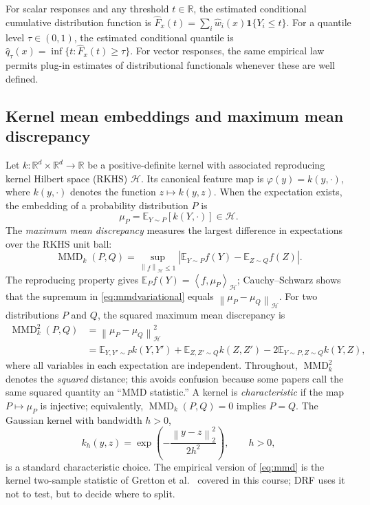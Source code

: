 \documentclass[12pt,a4paper]{article}
\newcommand{\E}{\mathbb E}
\newcommand{\R}{\mathbb R}
\newcommand{\calH}{\mathcal H}
\newcommand{\MMD}{\operatorname{MMD}}
\newcommand{\1}{\mathbf 1}
\newcommand{\norm}[1]{\left\lVert#1\right\rVert}
\newcommand{\ip}[2]{\left\langle#1,#2\right\rangle}
\begin{document}
For scalar responses and any threshold $t\in\R$, the estimated conditional cumulative distribution function is $\widehat F_x(t)=\sum_i\widehat w_i(x)\1\{Y_i\le t\}$. For a quantile level $\tau\in(0,1)$, the estimated conditional quantile is $\widehat q_\tau(x)=\inf\{t:\widehat F_x(t)\ge\tau\}$. For vector responses, the same empirical law permits plug-in estimates of distributional functionals whenever these are well defined.

\subsection{Kernel mean embeddings and maximum mean discrepancy}
Let $k:\R^d\times\R^d\to\R$ be a positive-definite kernel with associated reproducing kernel Hilbert space (RKHS) $\calH$. Its canonical feature map is $\varphi(y)=k(y,\cdot)$, where $k(y,\cdot)$ denotes the function $z\mapsto k(y,z)$. When the expectation exists, the embedding of a probability distribution $P$ is
\begin{equation}\label{eq:embedding}
 \mu_P=\E_{Y\sim P}[k(Y,\cdot)]\in\calH.
\end{equation}
The \emph{maximum mean discrepancy} measures the largest difference in expectations over the RKHS unit ball:
\begin{equation}\label{eq:mmdvariational}
 \MMD_k(P,Q)=\sup_{\norm{f}_{\calH}\le1}
 \left|\E_{Y\sim P}f(Y)-\E_{Z\sim Q}f(Z)\right|.
\end{equation}
The reproducing property gives $\E_P f(Y)=\ip{f}{\mu_P}_{\calH}$; Cauchy--Schwarz shows that the supremum in \eqref{eq:mmdvariational} equals $\norm{\mu_P-\mu_Q}_{\calH}$. For two distributions $P$ and $Q$, the squared maximum mean discrepancy is
\begin{align}\label{eq:mmd}
 \MMD_k^2(P,Q)&=\norm{\mu_P-\mu_Q}_{\calH}^2\\
 &=\E_{Y,Y'\sim P}k(Y,Y')+\E_{Z,Z'\sim Q}k(Z,Z')
 -2\E_{Y\sim P,Z\sim Q}k(Y,Z),\nonumber
\end{align}
where all variables in each expectation are independent. Throughout, $\MMD_k^2$ denotes the \emph{squared} distance; this avoids confusion because some papers call the same squared quantity an ``MMD statistic.'' A kernel is \emph{characteristic} if the map $P\mapsto\mu_P$ is injective; equivalently, $\MMD_k(P,Q)=0$ implies $P=Q$. The Gaussian kernel with bandwidth $h>0$,
\begin{equation}\label{eq:gaussiank}
 k_h(y,z)=\exp\!\left(-\frac{\norm{y-z}_2^2}{2h^2}\right),\qquad h>0,
\end{equation}
is a standard characteristic choice. The empirical version of \eqref{eq:mmd} is the kernel two-sample statistic of Gretton et al.\ \cite{gretton2012} covered in this course; DRF uses it not to test, but to decide where to split.
\end{document}

